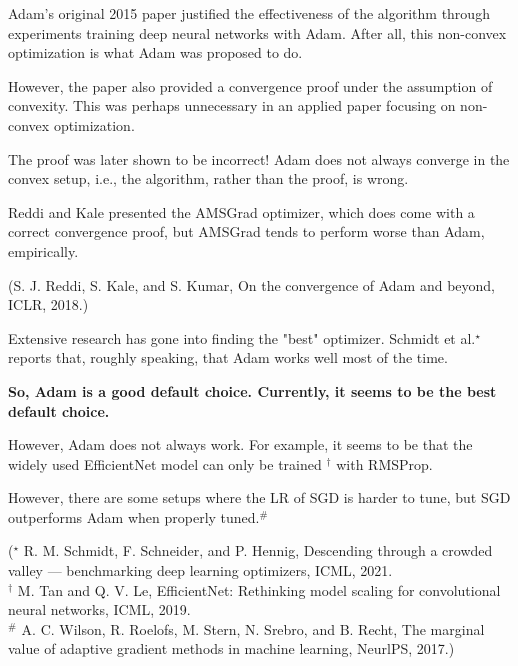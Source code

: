 \documentclass{report}
\begin{document}
\begin{concept}
    Adam's original 2015 paper justified the effectiveness of the algorithm through experiments training deep neural networks with Adam. After all, this non-convex optimization is what Adam was proposed to do.

    However, the paper also provided a convergence proof under the assumption of convexity. This was perhaps unnecessary in an applied paper focusing on non-convex optimization.

    The proof was later shown to be incorrect! Adam does not always converge in the convex setup, i.e., the algorithm, rather than the proof, is wrong.

    Reddi and Kale presented the AMSGrad optimizer, which does come with a correct convergence proof, but AMSGrad tends to perform worse than Adam, empirically.

    (S. J. Reddi, S. Kale, and S. Kumar, On the convergence of Adam and beyond, ICLR, 2018.)
\end{concept}

\begin{concept}
    Extensive research has gone into finding the "best" optimizer. Schmidt et al.${ }^{\star}$ reports that, roughly speaking, that Adam works well most of the time.

    \textbf{So, Adam is a good default choice. Currently, it seems to be the best default choice.}

    However, Adam does not always work. For example, it seems to be that the widely used EfficientNet model can only be trained ${ }^{\dagger}$ with RMSProp.

    However, there are some setups where the LR of SGD is harder to tune, but SGD outperforms Adam when properly tuned.${ }^{\#}$

    (${ }^{\star}$ R. M. Schmidt, F. Schneider, and P. Hennig, Descending through a crowded valley — benchmarking deep learning optimizers, ICML, 2021.\\
    ${ }^{\dagger}$ M. Tan and Q. V. Le, EfficientNet: Rethinking model scaling for convolutional neural networks, ICML, 2019.\\
    ${ }^{\#}$ A. C. Wilson, R. Roelofs, M. Stern, N. Srebro, and B. Recht, The marginal value of adaptive gradient methods in machine learning, NeurlPS, 2017.)
\end{concept}
\end{document}

